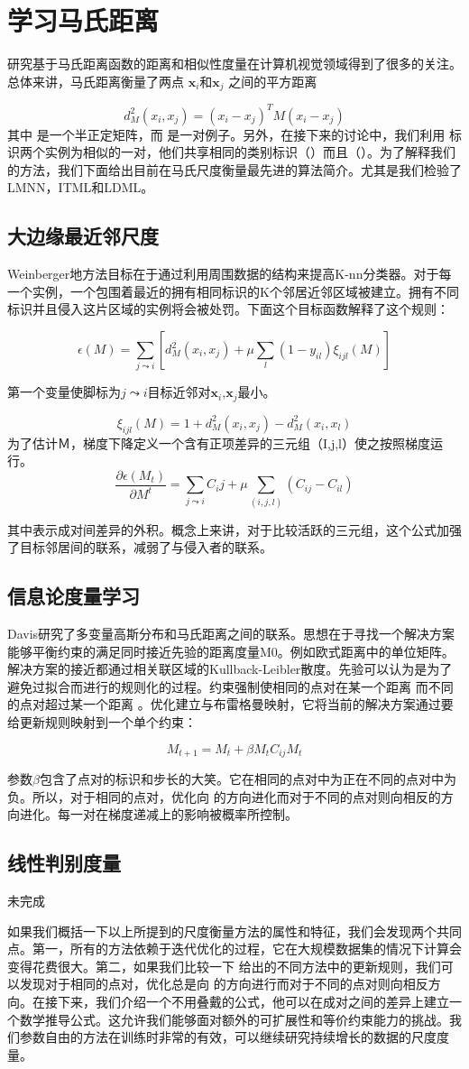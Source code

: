 \section{学习马氏距离}
研究基于马氏距离函数的距离和相似性度量在计算机视觉领域得到了很多的关注。总体来讲，马氏距离衡量了两点 $\mathbf x_i$和$\mathbf x_j$ 之间的平方距离

$$ d^{2}_{M}(x_{i},x_{j}) = (x_{i}-x_{j})^{T}M(x_{i}-x_{j}) $$
其中  是一个半正定矩阵，而  是一对例子。另外，在接下来的讨论中，我们利用    标识两个实例为相似的一对，他们共享相同的类别标识（）而且（）。为了解释我们的方法，我们下面给出目前在马氏尺度衡量最先进的算法简介。尤其是我们检验了LMNN，ITML和LDML。
\subsection{大边缘最近邻尺度}
Weinberger地方法目标在于通过利用周围数据的结构来提高K-nn分类器。对于每一个实例，一个包围着最近的拥有相同标识的K个邻居近邻区域被建立。拥有不同标识并且侵入这片区域的实例将会被处罚。下面这个目标函数解释了这个规则：

$$ \epsilon(M) = \sum_{j \leadsto i}[d^{2}_{M}(x_i,x_j)+\mu\sum_{l}(1 - y_{il})\xi_{ijl}(M)]$$

第一个变量使脚标为$j\leadsto i$目标近邻对$\mathbf x_i$,$\mathbf x_j$最小。

$$ \xi_{ijl}(M) = 1 + d_{M}^2(x_{i},x_{j}) - d_{M}^{2}(x_{i},x_{l})$$
为了估计Ｍ，梯度下降定义一个含有正项差异的三元组（I,j,l）使之按照梯度运行。
$$ \frac{\partial \epsilon (M_t)}{\partial M^t} = \sum_{j\leadsto i}C_ij + \mu \sum_{(i,j,l)}(C_{ij} - C_{il})$$

其中表示成对间差异的外积。概念上来讲，对于比较活跃的三元组，这个公式加强了目标邻居间的联系，减弱了与侵入者的联系。
\subsection{信息论度量学习}
Davis研究了多变量高斯分布和马氏距离之间的联系。思想在于寻找一个解决方案能够平衡约束的满足同时接近先验的距离度量M0。例如欧式距离中的单位矩阵。解决方案的接近都通过相关联区域的Kullback-Leibler散度。先验可以认为是为了避免过拟合而进行的规则化的过程。约束强制使相同的点对在某一个距离   而不同的点对超过某一个距离   。优化建立与布雷格曼映射，它将当前的解决方案通过要给更新规则映射到一个单个约束：

$$ M_{t+1} = M_t + \beta M_{t}C_{ij}M_{t}$$

参数$\beta$包含了点对的标识和步长的大笑。它在相同的点对中为正在不同的点对中为负。所以，对于相同的点对，优化向  的方向进化而对于不同的点对则向相反的方向进化。每一对在梯度递减上的影响被概率所控制。
\subsection{线性判别度量}
未完成

如果我们概括一下以上所提到的尺度衡量方法的属性和特征，我们会发现两个共同点。第一，所有的方法依赖于迭代优化的过程，它在大规模数据集的情况下计算会变得花费很大。第二，如果我们比较一下  给出的不同方法中的更新规则，我们可以发现对于相同的点对，优化总是向  的方向进行而对于不同的点对则向相反方向。在接下来，我们介绍一个不用叠戴的公式，他可以在成对之间的差异上建立一个数学推导公式。这允许我们能够面对额外的可扩展性和等价约束能力的挑战。我们参数自由的方法在训练时非常的有效，可以继续研究持续增长的数据的尺度度量。



